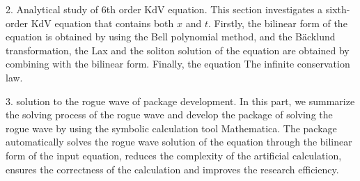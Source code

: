 \begin{eabstract}
2. Analytical study of 6th order KdV equation.
This section investigates a sixth-order KdV equation that contains both $x$ and $t$. Firstly, the bilinear form of the equation is obtained by using the Bell polynomial method, and the B\"{a}cklund transformation, the Lax and the soliton solution of the equation are obtained by combining with the bilinear form. Finally, the equation The infinite conservation law.

3. solution to the rogue wave of package development.
In this part, we summarize the solving process of the rogue wave and develop the package of solving the rogue wave by using the symbolic calculation tool Mathematica. The package automatically solves the rogue wave solution of the equation through the bilinear form of the input equation, reduces the complexity of the artificial calculation, ensures the correctness of the calculation and improves the research efficiency.

\end{eabstract}

